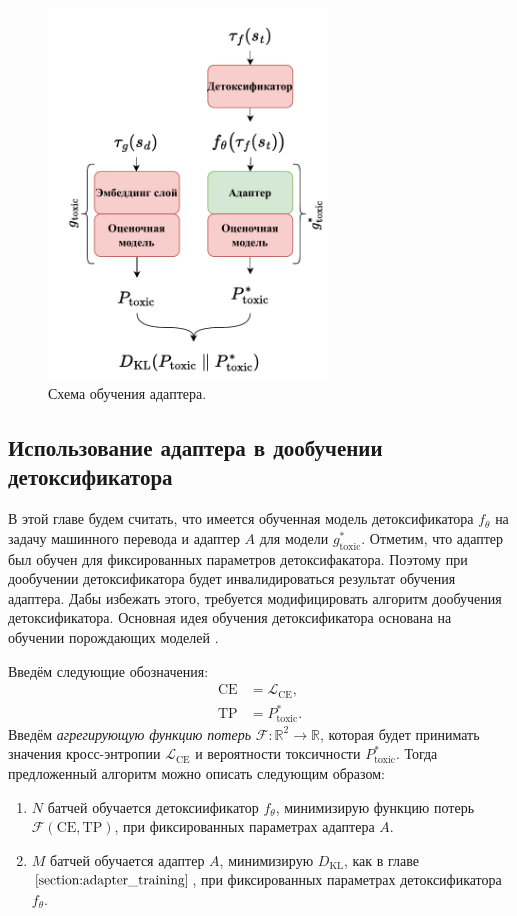 \begin{figure}[ht]
      \centering
      \includegraphics[width=0.66\textwidth]{images/adapter_train.pdf}
      \caption{Схема обучения адаптера.}
      \label{fig:adapter_training_schema}
\end{figure}

\subsection{Использование адаптера в дообучении детоксификатора}
\label{section:posttrain}
В этой главе будем считать, что имеется обученная модель детоксификатора $f_{\theta}$ на задачу машинного перевода и адаптер $A$ для модели $g^{*}_{\text{toxic}}$.
Отметим, что адаптер был обучен для фиксированных параметров детоксифакатора. 
Поэтому при дообучении детоксификатора будет инвалидироваться результат обучения адаптера.
Дабы избежать этого, требуется модифицировать алгоритм дообучения детоксификатора. 
Основная идея обучения детоксификатора основана на обучении порождающих моделей \cite{10.5555/2969033.2969125}.

Введём следующие обозначения:
\begin{align*}
    \text{CE} &= \mathcal{L}_{\text{CE}},\\
    \text{TP} &= P^{*}_{\text{toxic}}.
\end{align*}
Введём \textit{агрегирующую функцию потерь} $\mathcal{F}: \mathbb{R}^2 \to \mathbb{R}$, которая будет принимать значения кросс-энтропии $\mathcal{L}_{\text{CE}}$ и вероятности токсичности $P^{*}_{\text{toxic}}$.
Тогда предложенный алгоритм можно описать следующим образом: 
\begin{enumerate}
    \item $N$ батчей обучается детоксиификатор $f_{\theta}$, минимизирую функцию потерь $\mathcal{F} (\text{CE}, \text{TP})$, при фиксированных параметрах адаптера $A$.
    \item $M$ батчей обучается адаптер $A$, минимизирую $D_{\text{KL}}$, как в главе $\ref{section:adapter_training}$, при фиксированных параметрах детоксификатора $f_{\theta}$. 
\end{enumerate}